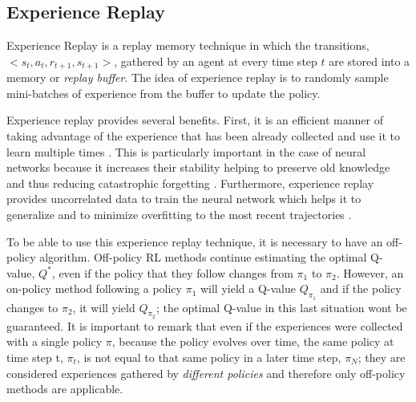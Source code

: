\subsection{Experience Replay}
\label{subsection:Experience Replay}

Experience Replay is a replay memory technique in which the transitions, $<s_t, a_t, r_{t+1}, s_{t+1}>$, gathered by an agent at every time step $t$ are stored into a memory or \textit{replay buffer}. The idea of experience replay is to randomly sample mini-batches of experience from the buffer to update the policy. 




Experience replay provides several benefits. First, it is an efficient manner of taking advantage of the experience that has been already collected and use it to learn multiple times \cite{Experience-Replay-zhang:2018}. This is particularly important in the case of neural networks because it increases their stability helping to preserve old knowledge and thus reducing catastrophic forgetting \cite{Experience_replay_stability:2019}.
Furthermore, experience replay provides uncorrelated data to train the neural network which helps it to generalize and to minimize overfitting to the most recent trajectories \cite{Machine_learning_finance:2019}.

 

To be able to use this experience replay technique, it is necessary to have an off-policy algorithm. Off-policy RL methods continue estimating the optimal Q-value, $Q^*$, even if the policy that they follow changes from $\pi_1$ to $\pi_2$. However, an on-policy method following a policy $\pi_1$ will yield a Q-value $Q_{\pi_1}$ and if the policy changes to $\pi_2$, it will yield $Q_{\pi_2}$; the optimal Q-value in this last situation wont be guaranteed. It is important to remark that even if the experiences were collected with a single policy $\pi$, because the policy evolves over time, the same policy at time step t, $\pi_t$, is not equal to that same policy in a later time step, $\pi_N$; they are considered experiences gathered by \textit{different policies} and therefore only off-policy methods are applicable.


